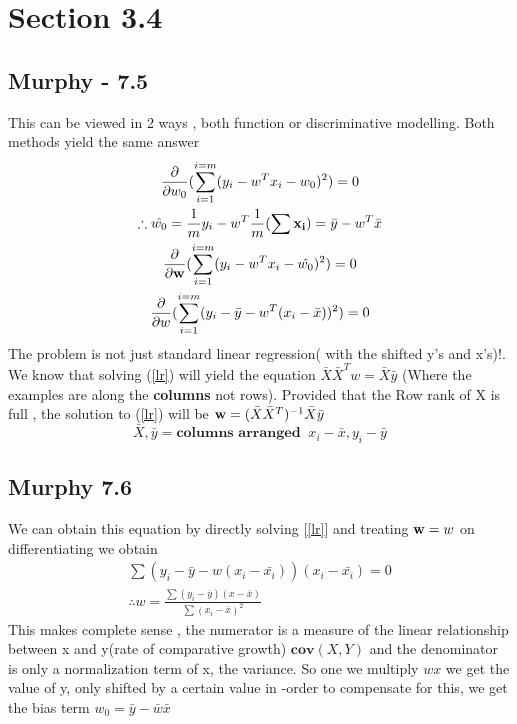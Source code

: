 \section{Section 3.4}
\subsection{Murphy - 7.5}
This can be viewed in 2 ways , both function or discriminative modelling. Both methods
yield the same answer
\begin{gather}
    \frac{\partial}{\partial w_0} (\sum_{i = 1}^{i=m}(y_i - w^Tx_i - w_0)^2) = 0
    \\
    \therefore \hat{w_0} = \frac{1}{m}y_i - w^T\frac{1}{m}(\sum \vb{x_i}) = \bar{y} - w^T\bar{x}
    \\
     \frac{\partial}{\partial \vb{w}} (\sum_{i = 1}^{i=m}(y_i - w^Tx_i - \hat{w_0})^2) = 0 
     \\
     \label{lr}
     \frac{\partial}{\partial w} (\sum_{i = 1}^{i=m}(y_i - \bar{y} - w^T(x_i - \bar{x}))^2) = 0
\end{gather}
The problem is not just standard linear regression( with the shifted y's and x's)!. We know that solving (\ref{lr}) will 
yield the equation  $\bar{X}\bar{X}^Tw = \bar{X}\bar{y}$ (Where the examples are along the \textbf{columns} not rows). Provided that
the Row rank of X is full , the solution to (\ref{lr}) will be $\vb{w} = (\bar{X}\bar{X}^T)^{-1} \bar{X}\bar{y}$
$$
\bar{X}, \bar{y} = \textbf{columns arranged  } \ x_i - \bar{x}, y_i - \bar{y}
$$

\subsection{Murphy 7.6}
We can obtain this equation by directly solving [\ref{lr}]  and treating $\vb{w} = w$
on differentiating we obtain 
\begin{gather}
    \sum (y_i - \bar{y} - w(x_i- \bar{x_i})) (x_i - \bar{x_i})  = 0
    \\
    \therefore w = \frac{\sum (y_i  - \bar{y})(x - \bar{x})}{\sum (x_i - \bar{x})^2 }
\end{gather}
This makes complete sense , the numerator is a measure of the linear relationship between x and y(rate of comparative growth) $\textbf{cov}( X, Y)$
and the denominator is only a normalization term of x, the variance. So one we multiply $wx$ we get the value of y, only shifted by a certain value
in -order to compensate for this, we get the bias term $w_0  = \bar{y} - \bar{w}\bar{x}$

